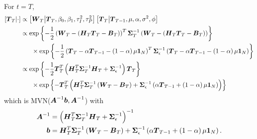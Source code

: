 \documentclass{article}\usepackage[]{graphicx}\usepackage[]{color}
\def\bm#1{\mbox{\boldmath $#1$}}
\begin{document}
%
For $t = T$,
%
\begin{align*}
%
\left[ \bm{T}_T \middle| \cdot \right] & \propto \left[ \bm{W}_T \middle| \bm{T}_T, \beta_0, \beta_1, \tau^2_I, \tau^2_P \right] \left[ \bm{T}_T \middle| \bm{T}_{T - 1}, \mu, \alpha, \sigma^2, \phi \right] \\
%
& \propto \exp{ \left\{ - \frac{1} {2} \left( \bm{W}_T - \left( \bm{H}_T \bm{T}_T - \bm{B}_T \right) \right)^T \bm{\Sigma}_T^{ - 1} \left( \bm{W}_T - \left( \bm{H}_T \bm{T}_T - \bm{B}_T \right)  \right) \right\} }\\
& \hspace{6mm} \times \exp{ \left\{ - \frac{1} {2} \left( \bm{T}_T - \alpha \bm{T}_{T - 1} - \left( 1 - \alpha \right) \mu \bm{1}_N \right)^T \bm{\Sigma}_\epsilon^{ - 1} \left( \bm{T}_T - \alpha \bm{T}_{T - 1} - \left( 1 - \alpha \right) \mu \bm{1}_N \right) \right\} }\\
%
& \propto \exp{ \left\{ - \frac{1} {2} \bm{T}_T^T \left(\bm{H}_T^T \bm{\Sigma}_T^{ - 1} \bm{H}_T +  \bm{\Sigma}_\epsilon^{ - 1} \right) \bm{T}_T \right\} }\\
& \hspace{6mm} \times \exp{ \left\{ - \bm{T}_T^T \left( \bm{H}_T^T \bm{\Sigma}_T^{ - 1} \left( \bm{W}_T - \bm{B}_T \right) + \bm{\Sigma}_\epsilon^{ - 1} \left( \alpha \bm{T}_{T - 1} + \left( 1 - \alpha \right) \mu \bm{1}_N \right) \right) \right\} }
%
\end{align*}
%
which is MVN($\bm{A}^{ - 1}\bm{b}, \bm{A}^{ - 1}$) with \\
\begin{align*}
%
\bm{A}^{ - 1} & = \left( \bm{H}_T^T \bm{\Sigma}_T^{ - 1} \bm{H}_T +  \bm{\Sigma}_\epsilon^{ - 1} \right)^{ - 1}\\
%
\bm{b} & =  \bm{H}_T^T \bm{\Sigma}_T^{ - 1} \left( \bm{W}_T - \bm{B}_T \right) + \bm{\Sigma}_\epsilon^{ - 1} \left( \alpha \bm{T}_{T - 1} + \left( 1 - \alpha \right) \mu \bm{1}_N \right).\\
%
\end{align*}
%
%
\end{document}
